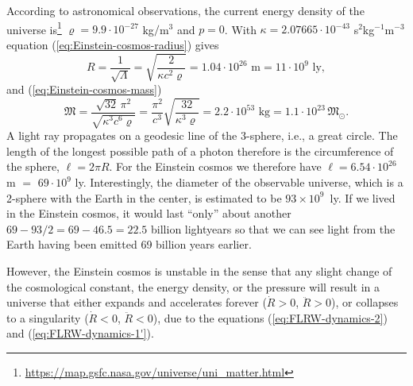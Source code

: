 \begin{beispiel}
	According to astronomical observations, the current energy density of the universe is\footnote{
		\url{https://map.gsfc.nasa.gov/universe/uni_matter.html}
	}
	$\varrho = 9.9 \cdot 10 ^{-27}$ kg$/$m$^3$ and $p = 0$.
	With $\kappa = 2.07665 \cdot 10^{-43}$ s$^2$kg$^{-1}$m$^{-3}$ equation 
	(\ref{eq:Einstein-cosmos-radius}) gives
	\begin{equation}
		R
		= \frac{1}{\sqrt{\Lambda}}
		= \sqrt{\frac{2}{\kappa c^2 \varrho}}
		= 1.04 \cdot 10^{26} \mbox{ m}
		= 11 \cdot 10^{9} \mbox{ ly}
		,
	\end{equation}
	and (\ref{eq:Einstein-cosmos-mass})
	\begin{equation}
		\mathfrak{M}
		= \frac{\sqrt{32} \, \pi^2}{\sqrt{\kappa^3 c^6 \varrho}}
		= \frac{\pi^2}{c^3} \sqrt{\frac{32}{\kappa^3 \varrho}}
		= 2.2 \cdot 10^{53} \mbox{ kg}
		= 1.1 \cdot 10^{23} \, \mathfrak{M}_{\odot}
		.
	\end{equation}
	A light ray propagates on a geodesic line of the 3-sphere, i.e., a great circle.
	The length of the longest possible path of a photon therefore is the circumference of the sphere, $\ell = 2 \pi R$. For the Einstein cosmos we therefore have
	$\ell = 6.54 \cdot 10^{26}$ m $=$ $69 \cdot 10^{9}$ ly.
	Interestingly, the diameter of the observable universe, which is a 2-sphere with the Earth in the center, is estimated to be 
	$93 \times 10^{9}$~ly. 
	If we lived in the Einstein cosmos, it would last “only” about another 
	$
		69 - 93/2 
		= 69 - 46.5 
		=
		22.5
	$ billion lightyears so that we can see light from the Earth having been emitted 69 billion years earlier.
\end{beispiel}

However, the Einstein cosmos is unstable in the sense that any slight change of the cosmological constant, the energy density, or the pressure will result in a universe that either expands and accelerates forever ($\dot{R} > 0$, $\ddot{R} > 0$), or collapses to a singularity ($\dot{R} < 0$, $\ddot{R} < 0$), due to the equations (\ref{eq:FLRW-dynamics-2}) and (\ref{eq:FLRW-dynamics-1'}).


